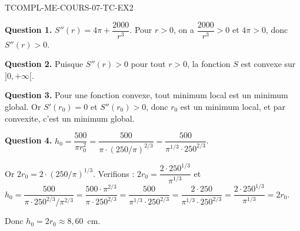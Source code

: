 \begin{corrige}{TCOMPL-ME-COURS-07-TC-EX2}

\textbf{Question 1.} $S''(r) = 4\pi + \dfrac{2000}{r^3}$. Pour $r > 0$, on a $\dfrac{2000}{r^3} > 0$ et $4\pi > 0$, donc $S''(r) > 0$.

\textbf{Question 2.} Puisque $S''(r) > 0$ pour tout $r > 0$, la fonction $S$ est convexe sur $]0, +\infty[$.

\textbf{Question 3.} Pour une fonction convexe, tout minimum local est un minimum global. Or $S'(r_0) = 0$ et $S''(r_0) > 0$, donc $r_0$ est un minimum local, et par convexite, c'est un minimum global.

\textbf{Question 4.} $h_0 = \dfrac{500}{\pi r_0^2} = \dfrac{500}{\pi \cdot (250/\pi)^{2/3}} = \dfrac{500}{\pi^{1/3} \cdot 250^{2/3}}$.

Or $2r_0 = 2 \cdot (250/\pi)^{1/3}$. Verifions : $2r_0 = \dfrac{2 \cdot 250^{1/3}}{\pi^{1/3}}$ et $h_0 = \dfrac{500}{\pi \cdot 250^{2/3}/\pi^{2/3}} = \dfrac{500 \cdot \pi^{2/3}}{\pi \cdot 250^{2/3}} = \dfrac{500}{\pi^{1/3} \cdot 250^{2/3}} = \dfrac{2 \cdot 250}{\pi^{1/3} \cdot 250^{2/3}} = \dfrac{2 \cdot 250^{1/3}}{\pi^{1/3}} = 2r_0$.

Donc $h_0 = 2r_0 \approx 8{,}60$~cm.

\end{corrige}

